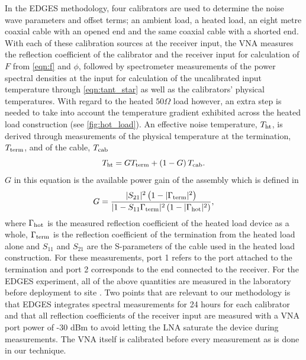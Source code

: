In the EDGES methodology, four calibrators are used to determine the noise wave parameters and offset terms; an ambient load, a heated load, an eight metre coaxial cable with an opened end and the same coaxial cable with a shorted end. With each of these calibration sources at the receiver input, the VNA measures the reflection coefficient of the calibrator and the receiver input for calculation of $F$ from \cref{eqn:f} and $\phi$, followed by spectrometer measurements of the power spectral densities at the input for calculation of the uncalibrated input temperature through \cref{eqn:tant_star} as well as the calibrators’ physical temperatures. With regard to the heated $50 \Omega$ load however, an extra step is needed to take into account the temperature gradient exhibited across the heated load construction (see \cref{fig:hot_load}). An effective noise temperature, $T_{\mathrm{ht}}$, is derived through measurements of the physical temperature at the termination, $T_{\mathrm{term}}$, and of the cable, $T_{\mathrm{cab}}$
\begin{equation}
    T_{\mathrm{ht}} = GT_{\mathrm{term}} + \left( 1 - G \right) T_{\mathrm{cab}}.
    \label{eqn:hot_load_correction}
\end{equation}
$G$ in this equation is the available power gain of the assembly which is defined in \citet{pozar}
\begin{equation}
    G = \frac{|S_{21}|^2 \left( 1 - |\Gamma_{\mathrm{term}}|^2 \right)}{|1 - S_{11}\Gamma_{\mathrm{term}}|^2 \left(1 - |\Gamma_{\mathrm{hot}}|^2 \right)},
    \label{eqn:g}
\end{equation}
where $\Gamma_{\mathrm{hot}}$ is the measured reflection coefficient of the heated load device as a whole, $\Gamma_{\mathrm{term}}$ is the reflection coefficient of the termination from the heated load alone and $S_{11}$ and $S_{21}$ are the S-parameters of the cable used in the heated load construction. For these measurements, port 1 refers to the port attached to the termination and port 2 corresponds to the end connected to the receiver. For the EDGES experiment, all of the above quantities are measured in the laboratory before deployment to site \citep{edgesCal}. Two points that are relevant to our methodology is that EDGES integrates spectral measurements for 24 hours for each calibrator and that all reflection coefficients of the receiver input are measured with a VNA port power of -30 dBm to avoid letting the LNA saturate the device during measurements. The VNA itself is calibrated before every measurement as is done in our technique.


